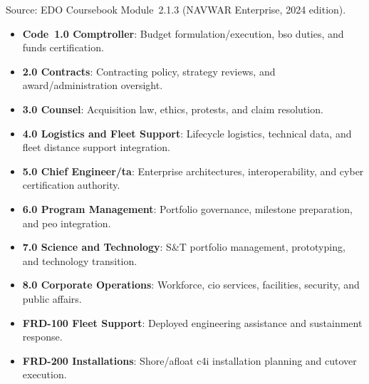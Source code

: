 \documentclass[../main.tex]{subfiles}
\begin{document}
\begin{description}[style=nextline, labelsep=0.5em, font=\bfseries]
	\item[\textbf{NAVWAR enterprise directorates.}]
	Source: EDO Coursebook Module~2.1.3 (NAVWAR Enterprise, 2024 edition).
      \begin{itemize}
        \item \textbf{Code~1.0 Comptroller}: Budget formulation/execution, \ac{bso} duties, and funds certification.
        \item \textbf{2.0 Contracts}: Contracting policy, strategy reviews, and award/administration oversight.
        \item \textbf{3.0 Counsel}: Acquisition law, ethics, protests, and claim resolution.
        \item \textbf{4.0 Logistics and Fleet Support}: Lifecycle logistics, technical data, and fleet distance support integration.
        \item \textbf{5.0 Chief Engineer/\ac{ta}}: Enterprise architectures, interoperability, and cyber certification authority.
        \item \textbf{6.0 Program Management}: Portfolio governance, milestone preparation, and \ac{peo} integration.
        \item \textbf{7.0 Science and Technology}: S\&T portfolio management, prototyping, and technology transition.
        \item \textbf{8.0 Corporate Operations}: Workforce, \ac{cio} services, facilities, security, and public affairs.
        \item \textbf{FRD-100 Fleet Support}: Deployed engineering assistance and sustainment response.
        \item \textbf{FRD-200 Installations}: Shore/afloat \ac{c4i} installation planning and cutover execution.
      \end{itemize}


\end{description}
\end{document}
